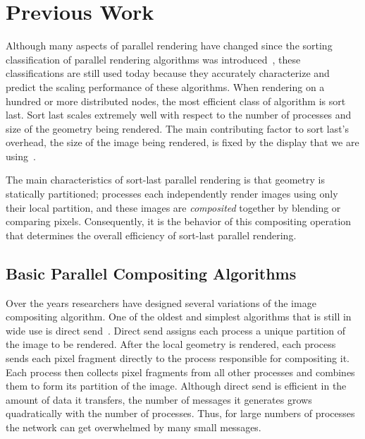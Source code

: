 \documentclass{acm_proc_article-sp}
\newcommand*{\lcite}[1]{~\cite{#1}}
\newcommand*{\keyterm}[1]{\emph{#1}}
\begin{document}
\section{Previous Work}
\label{sec:PreviousWork}

Although many aspects of parallel rendering have changed since the sorting
classification of parallel rendering algorithms was
introduced\lcite{Molnar1994}, these classifications are still used today
because they accurately characterize and predict the scaling performance of
these algorithms.  When rendering on a hundred or more distributed nodes,
the most efficient class of algorithm is sort last.  Sort last scales
extremely well with respect to the number of processes and size of the
geometry being rendered.  The main contributing factor to sort last's
overhead, the size of the image being rendered, is fixed by the display
that we are using\lcite{Wylie2001}.

The main characteristics of sort-last parallel rendering is that geometry
is statically partitioned; processes each independently render images using
only their local partition, and these images are \keyterm{composited}
together by blending or comparing pixels.  Consequently, it is the behavior
of this compositing operation that determines the overall efficiency of
sort-last parallel rendering.

\subsection{Basic Parallel Compositing Algorithms}
\label{sec:BasicParallelCompositingAlgorithms}

Over the years researchers have designed several variations of the image
compositing algorithm.  One of the oldest and simplest algorithms that is
still in wide use is direct send\lcite{DirectSend1,DirectSend2}.  Direct
send assigns each process a unique partition of the image to be rendered.
After the local geometry is rendered, each process sends each pixel
fragment directly to the process responsible for compositing it.  Each
process then collects pixel fragments from all other processes and combines
them to form its partition of the image.  Although direct send is efficient
in the amount of data it transfers, the number of messages it generates
grows quadratically with the number of processes.  Thus, for large numbers
of processes the network can get overwhelmed by many small messages.
\end{document}
